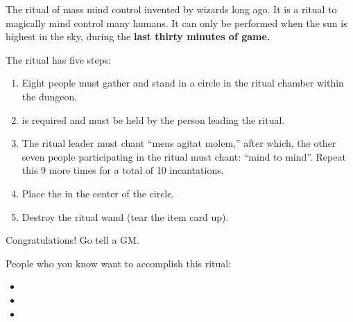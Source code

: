 \documentclass[green]{guildcamp2}
\begin{document}
\name{\gEnslaveRitual{}}
The ritual of mass mind control invented by wizards long ago. It is a ritual to magically mind control many humans. It can only be performed when the sun is highest in the sky, during the {\bf last thirty minutes of game.}

The ritual has five steps: 

\begin{enumerate}
\item Eight people must gather and stand in a circle in the ritual chamber within the dungeon.
\item \iRitualWand{} is required and must be held by the person leading the ritual.
\item The ritual leader must chant ``mens agitat molem,'' after which, the other seven people participating in the ritual must chant: ``mind to mind''. Repeat this 9 more times for a total of 10 incantations.
\item Place the \iDominationIdol{} in the center of the circle.
\item Destroy the ritual wand (tear the item card up).
\end{enumerate}

Congratulations! Go tell a GM.



People who you know want to accomplish this ritual:
\begin{itemize}
\item \cVampire{}
\item \cBasilisk{}
\item \cMinotaur{}
\end{itemize}
\end{document}
